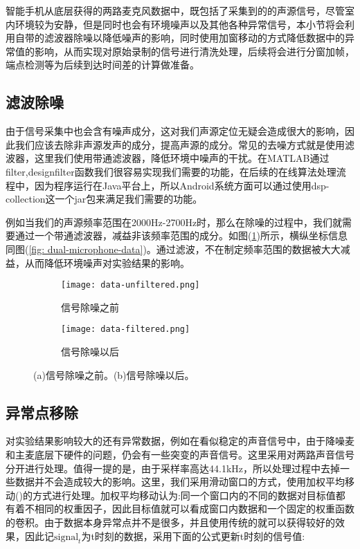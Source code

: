 \documentclass[winfonts,oneside]{njuthesis}
\begin{document}
		智能手机从底层获得的两路麦克风数据中，既包括了采集到的的声源信号，尽管室内环境较为安静，但是同时也会有环境噪声以及其他各种异常信号，本小节将会利用自带的滤波器除噪以降低噪声的影响，同时使用加窗移动的方式降低数据中的异常值的影响，从而实现对原始录制的信号进行清洗处理，后续将会进行分窗加帧，端点检测等为后续到达时间差的计算做准备。

		\subsection{滤波除噪}
			
			由于信号采集中也会含有噪声成分，这对我们声源定位无疑会造成很大的影响，因此我们应该去除非声源发声的成分，提高声源的成分。常见的去噪方式就是使用滤波器，这里我们使用带通滤波器，降低环境中噪声的干扰。在MATLAB通过filter,designfilter函数我们很容易实现我们需要的功能，在后续的在线算法处理流程中，因为程序运行在Java平台上，所以Android系统方面可以通过使用dsp-collection这一个jar包来满足我们需要的功能。
			
			例如当我们的声源频率范围在2000Hz-2700Hz时，那么在除噪的过程中，我们就需要通过一个带通滤波器，减益非该频率范围的成分。如图(\ref{fig: filter-data})所示，横纵坐标信息同图(\ref{fig: dual-microphone-data})。通过滤波，不在制定频率范围的数据被大大减益，从而降低环境噪声对实验结果的影响。
			
			\begin{figure}[H]
				\centering
				\begin{subfigure}{.45\textwidth}
					\centering
					\texttt{[image: data-unfiltered.png]}
					\caption{信号除噪之前}
				\end{subfigure}
				\begin{subfigure}{.45\textwidth}
					\centering
					\texttt{[image: data-filtered.png]}
					\caption{信号除噪以后}
				\end{subfigure}
				\caption{(a)信号除噪之前。(b)信号除噪以后。}
				\label{fig: filter-data}
			\end{figure}
					
		\subsection{异常点移除}
		
			对实验结果影响较大的还有异常数据，例如在看似稳定的声音信号中，由于降噪麦和主麦底层下硬件的问题，仍会有一些突变的声音信号。这里采用对两路声音信号分开进行处理。值得一提的是，由于采样率高达44.1kHz，所以处理过程中去掉一些数据并不会造成较大的影响。这里，我们采用滑动窗口的方式，使用加权平均移动(\cite{Moving_average})的方式进行处理。加权平均移动认为:同一个窗口内的不同的数据对目标值都有着不相同的权重因子，因此目标值就可以看成窗口内数据和一个固定的权重函数的卷积。由于数据本身异常点并不是很多，并且使用传统的就可以获得较好的效果，因此记$\text{signal}_t$为t时刻的数据，采用下面的公式更新t时刻的信号值:
			
\end{document}
